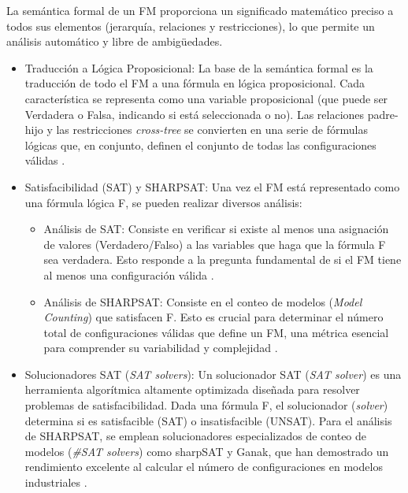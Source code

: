 La semántica formal de un \ac{FM} proporciona un
significado matemático preciso a todos sus elementos (jerarquía, relaciones y
restricciones), lo que permite un análisis automático y libre de ambigüedades.
\begin{itemize}
    \item Traducción a Lógica Proposicional: La base de la semántica formal es
    la traducción de todo el \ac{FM} a una fórmula en lógica proposicional. Cada
    característica se representa como una variable proposicional (que puede
    ser Verdadera o Falsa, indicando si está seleccionada o no). Las
    relaciones padre-hijo y las restricciones \textit{cross-tree} se convierten en una
    serie de fórmulas lógicas que, en conjunto, definen el conjunto de todas
    las configuraciones válidas \citep{sundermann2023sat, thum2014featureide}.
    \item Satisfacibilidad (\ac{SAT}) y \ac{SHARPSAT}: Una vez el \ac{FM} está representado como
    una fórmula lógica F, se pueden realizar diversos análisis:
        \begin{itemize}
            \item Análisis de \ac{SAT}: Consiste en verificar si existe al menos una
            asignación de valores (Verdadero/Falso) a las variables que haga
            que la fórmula F sea verdadera. Esto responde a la pregunta
            fundamental de si el \ac{FM} tiene al menos una configuración válida
            \citep{sundermann2023sat, benavides2010automated,mendonca2009SAT}.
            \item Análisis de \ac{SHARPSAT}: Consiste en el conteo de modelos (\textit{Model Counting}) que
            satisfacen F. Esto es crucial para determinar el número total de configuraciones válidas que
            define un \ac{FM}, una métrica esencial para comprender su
            variabilidad y complejidad \citep{sundermann2023sat, benavides2010automated,mendonca2009SAT}.
        \end{itemize}
    \item Solucionadores \ac{SAT} (\textit{SAT solvers}): Un solucionador \ac{SAT} (\textit{SAT solver}) es una herramienta algorítmica altamente
    optimizada diseñada para resolver problemas de satisfacibilidad. Dada
    una fórmula F, el solucionador (\textit{solver}) determina si es satisfacible (\ac{SAT}) o insatisfacible
    (UNSAT). Para el análisis de \ac{SHARPSAT}, se emplean solucionadores especializados de conteo de modelos (\textit{\#SAT solvers})
    como sharpSAT y Ganak, que han demostrado un
    rendimiento excelente al calcular el número de configuraciones en
    modelos industriales \citep{sundermann2023sat, soos2020Ganak}.
\end{itemize}

